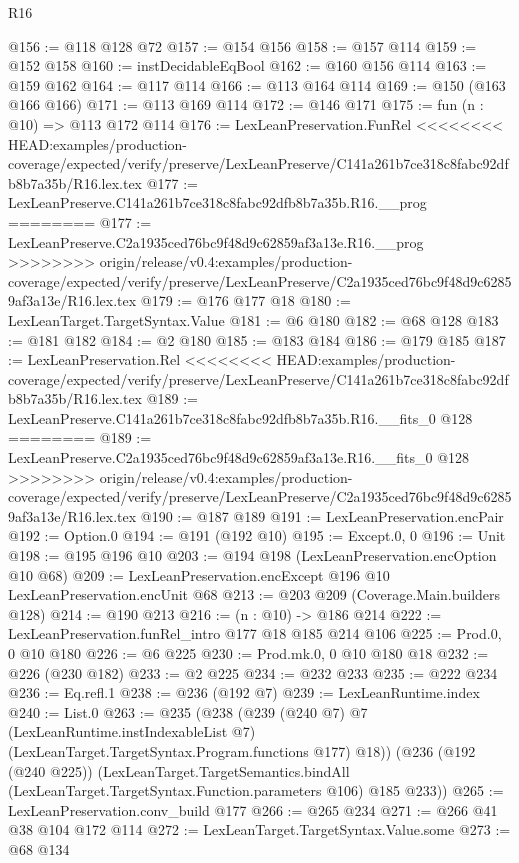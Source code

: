 \begin{lexlean}{R16}
\begin{coremodule}
{{{{{@156 := @118 @128 @72
@157 := @154 @156
@158 := @157 @114
@159 := @152 @158
@160 := instDecidableEqBool
@162 := @160 @156 @114
@163 := @159 @162
@164 := @117 @114
@166 := @113 @164 @114
@169 := @150 (@163 @166 @166)
@171 := @113 @169 @114
@172 := @146 @171
@175 := fun (n : @10) => @113 @172 @114
@176 := LexLeanPreservation.FunRel
<<<<<<<< HEAD:examples/production-coverage/expected/verify/preserve/LexLeanPreserve/C141a261b7ce318c8fabc92dfb8b7a35b/R16.lex.tex
@177 := LexLeanPreserve.C141a261b7ce318c8fabc92dfb8b7a35b.R16.__prog
========
@177 := LexLeanPreserve.C2a1935ced76bc9f48d9c62859af3a13e.R16.__prog
>>>>>>>> origin/release/v0.4:examples/production-coverage/expected/verify/preserve/LexLeanPreserve/C2a1935ced76bc9f48d9c62859af3a13e/R16.lex.tex
@179 := @176 @177 @18
@180 := LexLeanTarget.TargetSyntax.Value
@181 := @6 @180
@182 := @68 @128
@183 := @181 @182
@184 := @2 @180
@185 := @183 @184
@186 := @179 @185
@187 := LexLeanPreservation.Rel
<<<<<<<< HEAD:examples/production-coverage/expected/verify/preserve/LexLeanPreserve/C141a261b7ce318c8fabc92dfb8b7a35b/R16.lex.tex
@189 := LexLeanPreserve.C141a261b7ce318c8fabc92dfb8b7a35b.R16.__fits_0 @128
========
@189 := LexLeanPreserve.C2a1935ced76bc9f48d9c62859af3a13e.R16.__fits_0 @128
>>>>>>>> origin/release/v0.4:examples/production-coverage/expected/verify/preserve/LexLeanPreserve/C2a1935ced76bc9f48d9c62859af3a13e/R16.lex.tex
@190 := @187 @189
@191 := LexLeanPreservation.encPair
@192 := Option.{0}
@194 := @191 (@192 @10)
@195 := Except.{0, 0}
@196 := Unit
@198 := @195 @196 @10
@203 := @194 @198 (LexLeanPreservation.encOption @10 @68)
@209 := LexLeanPreservation.encExcept @196 @10 LexLeanPreservation.encUnit @68
@213 := @203 @209 (Coverage.Main.builders @128)
@214 := @190 @213
@216 := (n : @10) -> @186 @214
@222 := LexLeanPreservation.funRel_intro @177 @18 @185 @214 @106
@225 := Prod.{0, 0} @10 @180
@226 := @6 @225
@230 := Prod.mk.{0, 0} @10 @180 @18
@232 := @226 (@230 @182)
@233 := @2 @225
@234 := @232 @233
@235 := @222 @234
@236 := Eq.refl.{1}
@238 := @236 (@192 @7)
@239 := LexLeanRuntime.index
@240 := List.{0}
@263 := @235
    (@238
      (@239
        (@240 @7)
        @7
        (LexLeanRuntime.instIndexableList @7)
        (LexLeanTarget.TargetSyntax.Program.functions @177)
        @18))
    (@236
      (@192 (@240 @225))
      (LexLeanTarget.TargetSemantics.bindAll
        (LexLeanTarget.TargetSyntax.Function.parameters @106)
        @185
        @233))
@265 := LexLeanPreservation.conv_build @177
@266 := @265 @234
@271 := @266 @41 @38 @104 @172 @114
@272 := LexLeanTarget.TargetSyntax.Value.some
@273 := @68 @134
}}}}}
\end{coremodule}
\end{lexlean}
